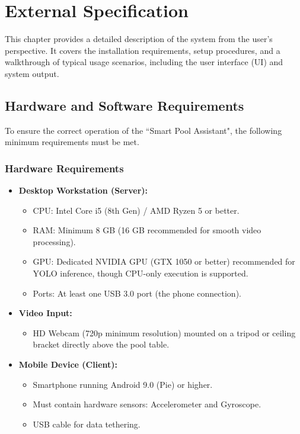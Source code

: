 \chapter{External Specification}

This chapter provides a detailed description of the system from the user's perspective. It covers the installation requirements, setup procedures, and a walkthrough of typical usage scenarios, including the user interface (UI) and system output.

\section{Hardware and Software Requirements}

To ensure the correct operation of the ``Smart Pool Assistant", the following minimum requirements must be met.

\subsection{Hardware Requirements}
\begin{itemize}
    \item \textbf{Desktop Workstation (Server):}
    \begin{itemize}
        \item CPU: Intel Core i5 (8th Gen) / AMD Ryzen 5 or better.
        \item RAM: Minimum 8 GB (16 GB recommended for smooth video processing).
        \item GPU: Dedicated NVIDIA GPU (GTX 1050 or better) recommended for YOLO inference, though CPU-only execution is supported.
        \item Ports: At least one USB 3.0 port (the phone connection).
    \end{itemize}
    \item \textbf{Video Input:}
    \begin{itemize}
        \item HD Webcam (720p minimum resolution) mounted on a tripod or ceiling bracket directly above the pool table.
    \end{itemize}
    \item \textbf{Mobile Device (Client):}
    \begin{itemize}
        \item Smartphone running Android 9.0 (Pie) or higher.
        \item Must contain hardware sensors: Accelerometer and Gyroscope.
        \item USB cable for data tethering.
    \end{itemize}
\end{itemize}

